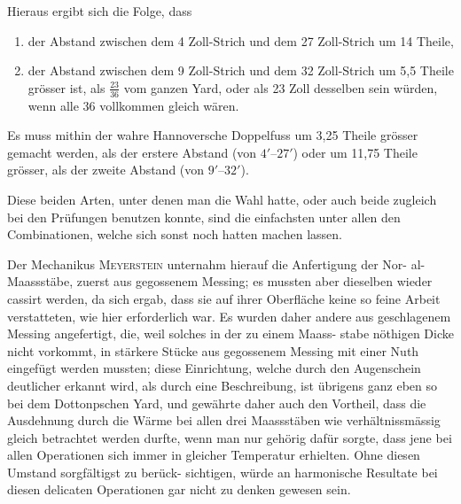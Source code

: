 \documentclass[12pt,a4paper]{article}
\theoremstyle{plain}
\theoremstyle{definition}
\theoremstyle{remark}
\begin{document}
Hieraus ergibt sich die Folge, dass
\begin{enumerate}[label=\arabic*.]
\item der Abstand zwischen dem 4 Zoll-Strich und dem 27 Zoll-Strich um
14 Theile,
\item der Abstand zwischen dem 9 Zoll-Strich und dem 32 Zoll-Strich um
5,5 Theile gr\"osser ist, als $\frac{23}{36}$ vom ganzen Yard, oder als 23 Zoll desselben
sein w\"urden, wenn alle 36 vollkommen gleich w\"aren.
\end{enumerate}

Es muss mithin der wahre Hannoversche Doppelfuss um 3,25 Theile
gr\"osser gemacht werden, als der erstere Abstand (von $4'$--$27'$) oder um 11,75
Theile gr\"osser, als der zweite Abstand (von $9'$--$32'$).

Diese beiden Arten, unter denen man die Wahl hatte, oder auch beide
zugleich bei den Pr\"ufungen benutzen konnte, sind die einfachsten unter allen
den Combinationen, welche sich sonst noch hatten machen lassen.

Der Mechanikus \textsc{Meyerstein} unternahm hierauf die Anfertigung der Nor-
al-Maassst\"abe, zuerst aus gegossenem Messing; es mussten aber dieselben
wieder cassirt werden, da sich ergab, dass sie auf ihrer Oberfl\"ache keine so
feine Arbeit verstatteten, wie hier erforderlich war. Es wurden daher andere
aus geschlagenem Messing angefertigt, die, weil solches in der zu einem Maass-
stabe n\"othigen Dicke nicht vorkommt, in st\"arkere St\"ucke aus gegossenem
Messing mit einer Nuth eingef\"ugt werden mussten; diese Einrichtung, welche
durch den Augenschein deutlicher erkannt wird, als durch eine Beschreibung,
ist \"ubrigens ganz eben so bei dem Dottonpschen Yard, und gew\"ahrte daher
auch den Vortheil, dass die Ausdehnung durch die W\"arme bei allen drei
Maassst\"aben wie verh\"altnissm\"assig gleich betrachtet werden durfte, wenn man
nur geh\"orig daf\"ur sorgte, dass jene bei allen Operationen sich immer in
gleicher Temperatur erhielten. Ohne diesen Umstand sorgf\"altigst zu ber\"uck-
sichtigen, w\"urde an harmonische Resultate bei diesen delicaten Operationen
gar nicht zu denken gewesen sein.
\end{document}
